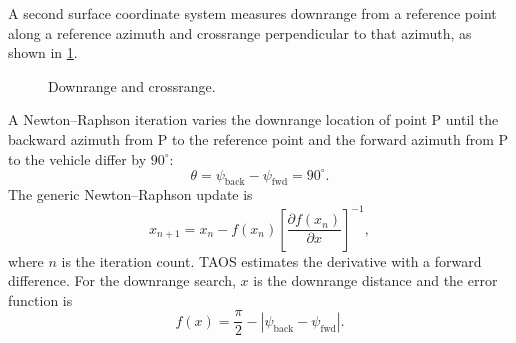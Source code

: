 
A second surface coordinate system measures downrange from a reference point along
a reference azimuth and crossrange perpendicular to that azimuth, as shown in
\cref{fig:downrange-crossrange}.

\begin{figure}[htbp]
  \centering
  \resizebox{0.78\linewidth}{!}{}
  \caption{Downrange and crossrange.}
  \label{fig:downrange-crossrange}
\end{figure}

A Newton--Raphson iteration varies the downrange location of point P until the
backward azimuth from P to the reference point and the forward azimuth from P to
the vehicle differ by $90^\circ$:
\begin{equation}
  \theta=\psi_{\mathrm{back}}-\psi_{\mathrm{fwd}}=90^\circ.
  \label{eq:downrange-crossrange-perpendicular}
\end{equation}
The generic Newton--Raphson update is
\begin{equation}
  x_{n+1}
  =x_n-f(x_n)\left[\frac{\partial f(x_n)}{\partial x}\right]^{-1},
  \label{eq:downrange-newton-raphson}
\end{equation}
where $n$ is the iteration count. TAOS estimates the derivative with a forward
difference. For the downrange search, $x$ is the downrange distance and the error
function is
\begin{equation}
  f(x)=\frac{\pi}{2}
       -\left|\psi_{\mathrm{back}}-\psi_{\mathrm{fwd}}\right|.
  \label{eq:downrange-error-function}
\end{equation}


